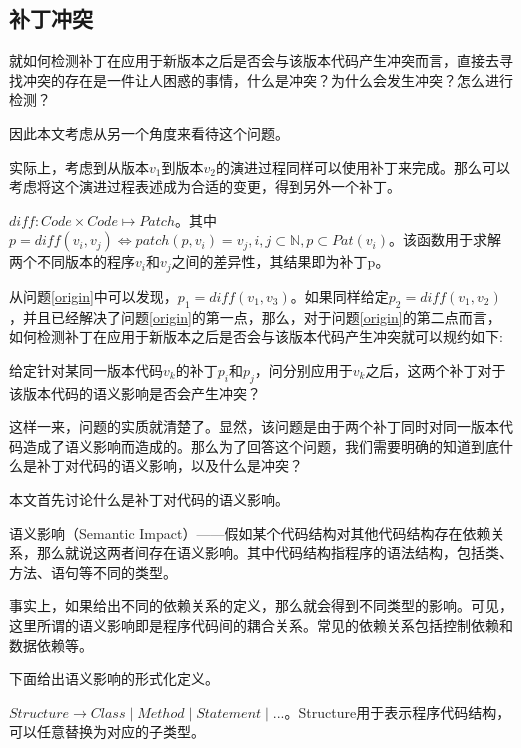 \subsection{补丁冲突}

就如何检测补丁在应用于新版本之后是否会与该版本代码产生冲突而言，直接去寻找冲突的存在是一件让人困惑的事情，什么是冲突？为什么会发生冲突？怎么进行检测？

因此本文考虑从另一个角度来看待这个问题。

实际上，考虑到从版本$v_1$到版本$v_2$的演进过程同样可以使用补丁来完成。那么可以考虑将这个演进过程表述成为合适的变更，得到另外一个补丁。

\begin{definition}
	\label {define_diff}
	$diff : Code \times Code \mapsto Patch$。其中$p = diff(v_i,v_j) \iff patch(p,v_i) = v_j,i,j \subset \mathbb{N},p \subset Pat(v_i)$。该函数用于求解两个不同版本的程序$v_i$和$v_j$之间的差异性，其结果即为补丁p。
\end{definition}

从问题\ref {origin}中可以发现，$p_{1} = diff(v_{1},v_{3})$。如果同样给定$p_{2} = diff(v_{1},v_{2})$，并且已经解决了问题\ref {origin}的第一点，那么，对于问题\ref {origin}的第二点而言，如何检测补丁在应用于新版本之后是否会与该版本代码产生冲突就可以规约如下:

	给定针对某同一版本代码$v_k$的补丁$p_i$和$p_j$，问分别应用于$v_k$之后，这两个补丁对于该版本代码的语义影响是否会产生冲突？

这样一来，问题的实质就清楚了。显然，该问题是由于两个补丁同时对同一版本代码造成了语义影响而造成的。那么为了回答这个问题，我们需要明确的知道到底什么是补丁对代码的语义影响，以及什么是冲突？

本文首先讨论什么是补丁对代码的语义影响。

\begin{definition}
	语义影响（Semantic Impact）——假如某个代码结构对其他代码结构存在依赖关系，那么就说这两者间存在语义影响。其中代码结构指程序的语法结构，包括类、方法、语句等不同的类型。
\end{definition}

事实上，如果给出不同的依赖关系的定义，那么就会得到不同类型的影响。可见，这里所谓的语义影响即是程序代码间的耦合关系。常见的依赖关系包括控制依赖和数据依赖等。

下面给出语义影响的形式化定义。

\begin{definition}
	$Structure \to Class \mid Method \mid Statement \mid ...$。Structure用于表示程序代码结构，可以任意替换为对应的子类型。
\end{definition}

